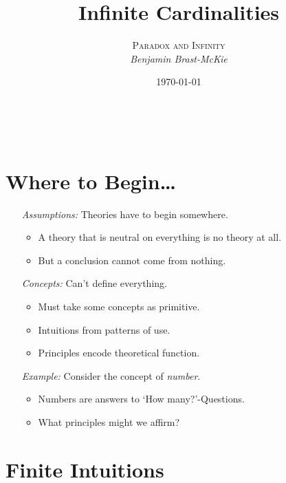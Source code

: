 \documentclass[a4paper, 11pt]{article} %
\title{\textbf{Infinite Cardinalities}} %
\author{\textsc{Paradox and Infinity}\\ \em Benjamin Brast-McKie} %
\date{\today} %
\makeatletter
\renewcommand{\maketitle}{ %
\begin{flushright} %
{\LARGE\@title} %

\vspace{10pt} %

{\@author} %
\\\@date %

\vspace{-10pt} %
\end{flushright}
}
\makeatother
\begin{document}
\maketitle %

\thispagestyle{empty}


\section*{Where to Begin\ldots}

\begin{enumerate}
  \item[\it Assumptions:] Theories have to begin somewhere. 
    \begin{itemize}[leftmargin=-.2in]
      \item A theory that is neutral on everything is no theory at all. 
      \item But a conclusion cannot come from nothing.
    \end{itemize}
  \item[\it Concepts:] Can't define everything.
    \begin{itemize}[leftmargin=-.2in]
      \item Must take some concepts as primitive.
      \item Intuitions from patterns of use.
      \item Principles encode theoretical function.
    \end{itemize}
  \item[\it Example:] Consider the concept of \textit{number}. 
    \begin{itemize}[leftmargin=-.2in]
      \item Numbers are answers to `How many?'-Questions.
      \item What principles might we affirm?
    \end{itemize}
\end{enumerate}





\section*{Finite Intuitions}
\end{document}
